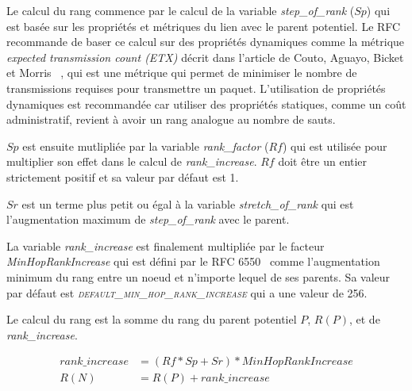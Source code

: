         Le calcul du rang commence par le calcul de la variable \textit{step\_of\_rank} ($Sp$) qui est 
        basée sur  les propriétés et métriques du lien avec le parent potentiel. Le RFC 
        recommande de baser ce calcul sur des propriétés dynamiques comme la métrique \textit{expected transmission count (ETX)} décrit dans l'article de Couto, Aguayo, Bicket et Morris
        ~\cite{paper:etx}, qui est une métrique qui permet de minimiser le nombre de transmissions requises pour transmettre un paquet.
        L'utilisation de propriétés dynamiques est recommandée car utiliser des propriétés statiques, comme un coût administratif, revient à avoir un
        rang analogue au nombre de sauts. 
        
        $Sp$ est ensuite mutlipliée par la variable \textit{rank\_factor} ($Rf$) qui est utilisée pour multiplier son effet dans le calcul de
        \textit{rank\_increase}. $Rf$ doit être un entier strictement positif et sa valeur par défaut est 1.

        $Sr$ est un terme plus petit ou égal à la variable \textit{stretch\_of\_rank} qui est l'augmentation maximum de \textit{step\_of\_rank} avec le parent.


        La variable \textit{rank\_increase} est finalement multipliée par le facteur \textit{MinHopRankIncrease} qui est défini par le RFC 6550~\cite{rfc:rpl} comme l'augmentation minimum du rang entre un noeud et n'importe lequel de ses parents. Sa valeur par défaut est \textsl{\textsc{default\_min\_hop\_rank\_increase}} qui a une valeur de 256.
        
        Le calcul du rang est la somme du rang du parent potentiel $P$, $R(P)$, et de \textit{rank\_increase}.

        \begin{equation}\label{eq:state-rankOF0}
            \begin{aligned}
                rank\_increase &= (Rf * Sp + Sr) * MinHopRankIncrease\\
                R(N) &= R(P) + rank\_increase    
            \end{aligned}
        \end{equation} 
                
